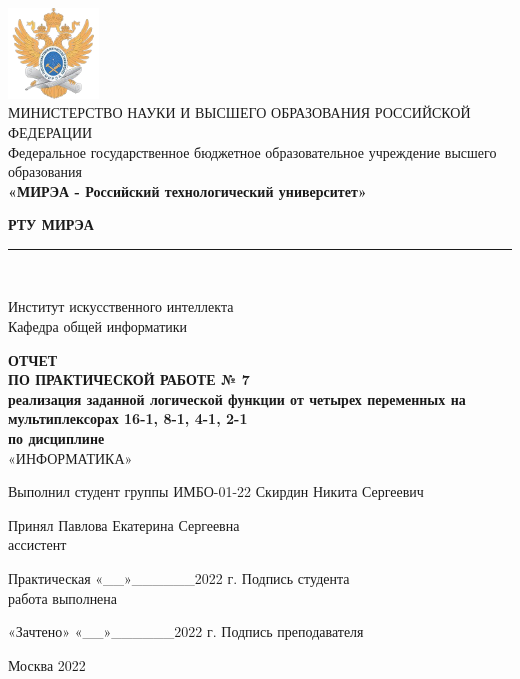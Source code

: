 \documentclass[14pt, a4paper]{extreport}
\newcommand{\doublerule}[1][.4pt]{%
	\noindent
	\makebox[0pt][l]{\rule[.6ex]{\linewidth}{#1}}%
	\rule[.3ex]{\linewidth}{#1}
}
\begin{document}
\begin{titlepage}
	\begin{center}
		\vspace*{0.5mm}

		\includegraphics[width=0.18\textwidth]{logo}\\
		\footnotesize
		МИНИСТЕРСТВО НАУКИ И ВЫСШЕГО ОБРАЗОВАНИЯ РОССИЙСКОЙ ФЕДЕРАЦИИ\\
		\small
		Федеральное государственное бюджетное образовательное учреждение высшего образования\\
		\textbf{«МИРЭА - Российский технологический университет»}
		\vspace{0.5cm}

		\large \textbf{РТУ МИРЭА} \normalsize

		\doublerule[1pt]\\
		\vspace{0.4cm}

		Институт искусственного интеллекта\\
		Кафедра общей информатики
		\vspace{1.5cm}

		\textbf{ОТЧЕТ}\\
		\textbf{ПО ПРАКТИЧЕСКОЙ РАБОТЕ № 7}\\
		\textbf{реализация заданной логической функции от четырех переменных на мультиплексорах 16-1, 8-1, 4-1, 2-1}\\
		\textbf{по дисциплине}\\
		«ИНФОРМАТИКА»
		\vspace{1.5cm}

		\small
		Выполнил студент группы ИМБО-01-22 \hfill Скирдин Никита Сергеевич
		\vspace{1cm}

		Принял \hfill Павлова Екатерина Сергеевна\\
		ассистент \hfill
		\vspace{1.5cm}

		\footnotesize
		\hspace{0.5cm} Практическая \hfill «\_\_»\_\_\_\_\_\_2022 г. \hfill Подпись студента\\
		\hspace{0.5cm} работа выполнена \hfill
		\vspace{0.5cm}

		\hspace{2cm} «Зачтено» \hfill «\_\_»\_\_\_\_\_\_2022 г. \hfill Подпись преподавателя
		\vfill

		\small
		Москва 2022
	\end{center}
	\thispagestyle{empty}
\end{titlepage}
\end{document}
